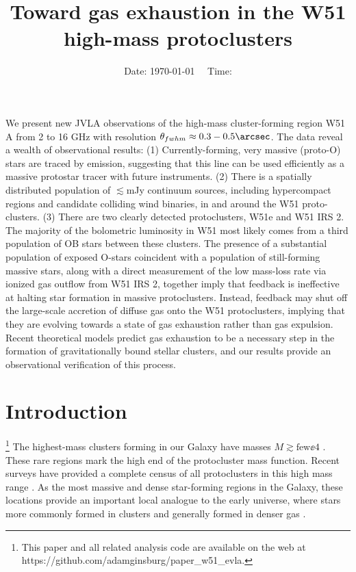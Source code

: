 



\title{Toward gas exhaustion in the W51 high-mass protoclusters}


\date{Date: \today ~~ Time: \currenttime}

\abstract
{
We present new JVLA observations of the high-mass cluster-forming region W51 A
from 2 to 16 GHz with resolution
$\theta_{fwhm}\approx0.3-0.5\arcsec$.  The data reveal a wealth of
observational results:
(1) Currently-forming, very massive (proto-O) stars are traced by \ortho \twotwo emission, 
suggesting that this line can be used efficiently as a massive protostar tracer
with future instruments.
(2) There is a spatially distributed population of $\lesssim$mJy continuum sources,
including hypercompact \hii regions and candidate colliding wind binaries,
in and around the W51 proto-clusters.  
(3) There are two clearly detected protoclusters, W51e and W51 IRS 2.  The
majority of the bolometric luminosity in W51 most likely comes from a third
population of OB stars between these clusters.
The presence of a substantial population of exposed O-stars coincident with
a population of still-forming massive stars, along with a direct measurement
of the low mass-loss rate via ionized gas outflow from W51 IRS 2, together imply
that feedback is ineffective at halting star formation in massive
protoclusters.  Instead, feedback may shut off the large-scale accretion of
diffuse gas onto the W51 protoclusters, implying that they are evolving towards
a state of gas exhaustion rather than gas expulsion. Recent theoretical models
predict gas exhaustion to be a necessary step in the formation of
gravitationally bound stellar clusters, and our results provide an
observational verification of this process.
}

\maketitle


\section{Introduction}
\footnote{
This paper and all related analysis code are available on the web at
https://github.com/adamginsburg/paper\_w51\_evla.
}
The highest-mass clusters forming in our Galaxy have masses
$M\gtrsim\textrm{few}\ee{4}$ \msun \citep{Portegies-Zwart2010a}.
These rare regions mark the high end of the protocluster mass function.
Recent surveys have provided a complete census of all protoclusters in this
high mass range \citep{Ginsburg2012a,Urquhart2013b,Urquhart2014b}.  As the
most massive and dense star-forming regions in the Galaxy, these locations
provide an important local analogue to the early universe, where stars more
commonly formed in clusters and generally formed in denser gas
\citep{Kruijssen2012a,Madau2014a}.

